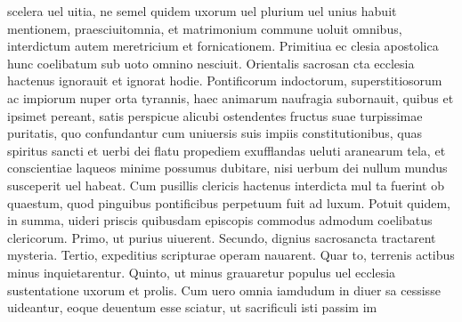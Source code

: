 \documentclass{article}
\begin{document}
\begin{pages}
scelera uel uitia, ne semel quidem uxorum uel plurium uel unius habuit mentionem, praesciuitomnia, et matrimonium commune uoluit omnibus, interdictum autem meretricium et fornicationem. Primitiua ec clesia apostolica hunc coelibatum sub uoto omnino nesciuit. Orientalis sacrosan cta ecclesia hactenus ignorauit et ignorat hodie. Pontificorum indoctorum, superstitiosorum ac impiorum nuper orta tyrannis, haec animarum naufragia subornauit, quibus et ipsimet pereant, satis perspicue alicubi ostendentes fructus suae turpissimae puritatis, quo confundantur cum uniuersis suis impiis constitutionibus, quas spiritus sancti et uerbi dei flatu propediem exufflandas ueluti aranearum tela, et conscientiae laqueos minime possumus dubitare, nisi uerbum dei nullum mundus susceperit uel habeat. Cum pusillis clericis hactenus interdicta mul ta fuerint ob quaestum, quod pinguibus pontificibus perpetuum fuit ad luxum. Potuit quidem, in summa, uideri priscis quibusdam episcopis commodus admodum coelibatus clericorum. Primo, ut purius uiuerent. Secundo, dignius sacrosancta tractarent mysteria. Tertio, expeditius scripturae operam nauarent. Quar to, terrenis actibus minus inquietarentur. Quinto, ut minus grauaretur populus uel ecclesia sustentatione uxorum et prolis. Cum uero omnia iamdudum in diuer sa cessisse uideantur, eoque deuentum esse sciatur, ut sacrificuli isti passim im  \pend

\end{pages}
\end{document}
